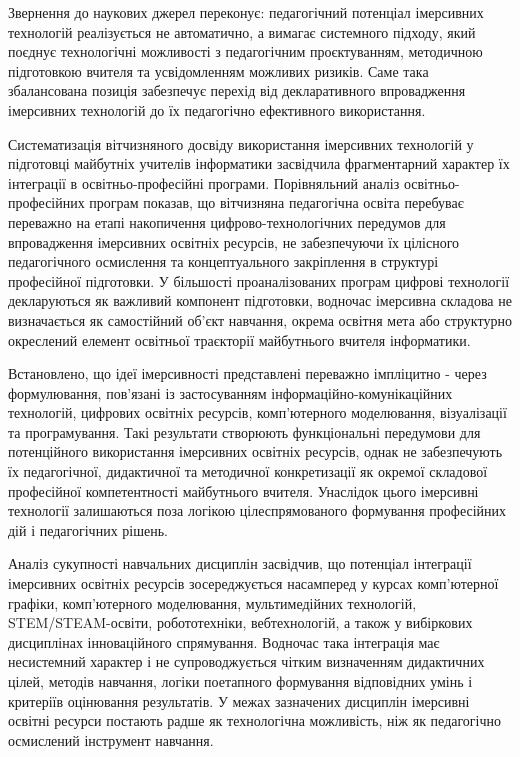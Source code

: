 Звернення до наукових джерел переконує: педагогічний потенціал імерсивних технологій реалізується не автоматично, а вимагає системного підходу, який поєднує технологічні можливості з педагогічним проєктуванням, методичною підготовкою вчителя та усвідомленням можливих ризиків. Саме така збалансована позиція забезпечує перехід від декларативного впровадження імерсивних технологій до їх педагогічно ефективного використання.

Систематизація вітчизняного досвіду використання імерсивних технологій у підготовці майбутніх учителів інформатики засвідчила фрагментарний характер їх інтеграції в освітньо-професійні програми. Порівняльний аналіз освітньо-професійних програм показав, що вітчизняна педагогічна освіта перебуває переважно на етапі накопичення цифрово-технологічних передумов для впровадження імерсивних освітніх ресурсів, не забезпечуючи їх цілісного педагогічного осмислення та концептуального закріплення в структурі професійної підготовки. У більшості проаналізованих програм цифрові технології декларуються як важливий компонент підготовки, водночас імерсивна складова не визначається як самостійний об'єкт навчання, окрема освітня мета або структурно окреслений елемент освітньої траєкторії майбутнього вчителя інформатики.

Встановлено, що ідеї імерсивності представлені переважно імпліцитно - через формулювання, пов'язані із застосуванням інформаційно-комунікаційних технологій, цифрових освітніх ресурсів, комп'ютерного моделювання, візуалізації та програмування. Такі результати створюють функціональні передумови для потенційного використання імерсивних освітніх ресурсів, однак не забезпечують їх педагогічної, дидактичної та методичної конкретизації як окремої складової професійної компетентності майбутнього вчителя. Унаслідок цього імерсивні технології залишаються поза логікою цілеспрямованого формування професійних дій і педагогічних рішень.

Аналіз сукупності навчальних дисциплін засвідчив, що потенціал інтеграції імерсивних освітніх ресурсів зосереджується насамперед у курсах комп'ютерної графіки, комп'ютерного моделювання, мультимедійних технологій, STEM/STEAM-освіти, робототехніки, вебтехнологій, а також у вибіркових дисциплінах інноваційного спрямування. Водночас така інтеграція має несистемний характер і не супроводжується чітким визначенням дидактичних цілей, методів навчання, логіки поетапного формування відповідних умінь і критеріїв оцінювання результатів. У межах зазначених дисциплін імерсивні освітні ресурси постають радше як технологічна можливість, ніж як педагогічно осмислений інструмент навчання.

